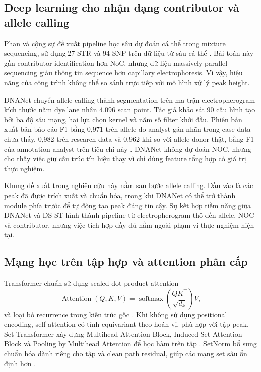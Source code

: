 \documentclass[12pt,a4paper]{article}
\begin{document}
\subsection{Deep learning cho nhận dạng contributor và allele calling}

Phan và cộng sự đề xuất pipeline học sâu dự đoán cá thể trong mixture sequencing, sử dụng 27 STR và 94 SNP trên dữ liệu từ sáu cá thể \cite{phan2021}. Bài toán này gần contributor identification hơn NoC, nhưng dữ liệu massively parallel sequencing giàu thông tin sequence hơn capillary electrophoresis. Vì vậy, hiệu năng của công trình không thể so sánh trực tiếp với mô hình xử lý peak height.

DNANet chuyển allele calling thành segmentation trên ma trận electropherogram kích thước năm dye lane nhân 4.096 scan point. Tác giả khảo sát 90 cấu hình tạo bởi ba độ sâu mạng, hai lựa chọn kernel và năm số filter khởi đầu. Phiên bản xuất bản báo cáo F1 bằng 0,971 trên allele do analyst gán nhãn trong case data chưa thấy, 0,982 trên research data và 0,962 khi so với allele donor thật, bằng F1 của annotation analyst trên tiêu chí này \cite{dewit2025}. DNANet không dự đoán NOC, nhưng cho thấy việc giữ cấu trúc tín hiệu thay vì chỉ dùng feature tổng hợp có giá trị thực nghiệm.

Khung đề xuất trong nghiên cứu này nằm sau bước allele calling. Đầu vào là các peak đã được trích xuất và chuẩn hóa, trong khi DNANet có thể trở thành module phía trước để tự động tạo peak đáng tin cậy. Sự kết hợp tiềm năng giữa DNANet và DS-ST hình thành pipeline từ electropherogram thô đến allele, NOC và contributor, nhưng việc tích hợp đầy đủ nằm ngoài phạm vi thực nghiệm hiện tại.

\subsection{Mạng học trên tập hợp và attention phân cấp}

Transformer chuẩn sử dụng scaled dot product attention
\begin{equation}
\operatorname{Attention}(Q,K,V)=
\operatorname{softmax}\left(\frac{QK^\top}{\sqrt{d_k}}\right)V,
\end{equation}
và loại bỏ recurrence trong kiến trúc gốc \cite{vaswani2017}. Khi không sử dụng positional encoding, self attention có tính equivariant theo hoán vị, phù hợp với tập peak. Set Transformer xây dựng Multihead Attention Block, Induced Set Attention Block và Pooling by Multihead Attention để học hàm trên tập \cite{lee2019}. SetNorm bổ sung chuẩn hóa dành riêng cho tập và clean path residual, giúp các mạng set sâu ổn định hơn \cite{zhang2023setnorm}.
\end{document}
